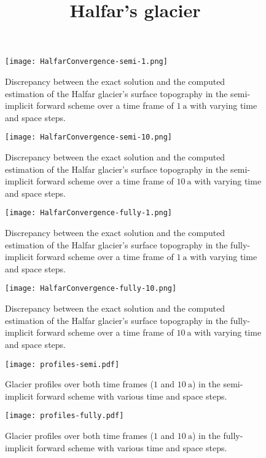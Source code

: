\documentclass[a4paper, 12pt]{article}
\title{Halfar's glacier}
\begin{document}
\maketitle
\begin{figure}
\centering
\texttt{[image: HalfarConvergence-semi-1.png]}
\caption{Discrepancy between the exact solution and the computed estimation of the Halfar glacier's surface topography in the semi-implicit forward scheme over a time frame of $1~\mathrm{a}$ with varying time and space steps. }
\end{figure}

\begin{figure}
\centering
\texttt{[image: HalfarConvergence-semi-10.png]}
\caption{Discrepancy between the exact solution and the computed estimation of the Halfar glacier's surface topography in the semi-implicit forward scheme over a time frame of $10~\mathrm{a}$ with varying time and space steps. }
\end{figure}

\begin{figure}
\centering
\texttt{[image: HalfarConvergence-fully-1.png]}
\caption{Discrepancy between the exact solution and the computed estimation of the Halfar glacier's surface topography in the fully-implicit forward scheme over a time frame of $1~\mathrm{a}$ with varying time and space steps. }
\end{figure}

\begin{figure}
\centering
\texttt{[image: HalfarConvergence-fully-10.png]}
\caption{Discrepancy between the exact solution and the computed estimation of the Halfar glacier's surface topography in the fully-implicit forward scheme over a time frame of $10~\mathrm{a}$ with varying time and space steps. }
\end{figure}

\begin{figure}
\centering
\texttt{[image: profiles-semi.pdf]}
\caption{Glacier profiles over both time frames ($1$ and $10~\mathrm{a}$) in the semi-implicit forward scheme with various time and space steps. }
\end{figure}

\begin{figure}
\centering
\texttt{[image: profiles-fully.pdf]}
\caption{Glacier profiles over both time frames ($1$ and $10~\mathrm{a}$) in the fully-implicit forward scheme with various time and space steps. }
\end{figure}
\end{document}
